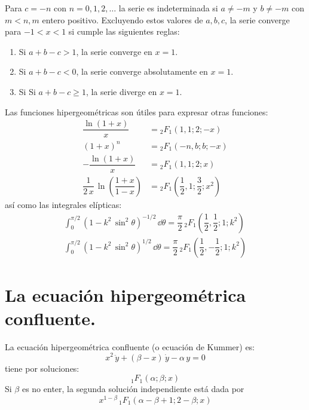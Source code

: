 \par
Para $c = -n$ con $n = 0, 1, 2, \ldots$ la serie es indeterminada si $a \neq -m$ y $b \neq -m$ con $m < n, m$ entero positivo. Excluyendo estos valores de $a, b, c$, la serie converge para $-1 < x < 1$ si cumple las siguientes reglas:
\begin{enumerate}[label=\alph*)]
\item Si $a + b - c > 1$, la serie converge en $x = 1$.
\item Si $a + b - c < 0$, la serie converge absolutamente en $x = 1$.
\item Si Si $a + b - c \geq 1$, la serie diverge en $x = 1$.
\end{enumerate}
Las funciones hipergeométricas son útiles para expresar otras funciones:
\begin{align*}
\dfrac{\ln (1 + x)}{x} &= {}_{2} F_{1}(1, 1; 2; -x) \\
(1 + x)^{n} &= {}_{2} F_{1}(-n, b; b; -x) \\
- \dfrac{\ln (1 + x)}{x} &= {}_{2} F_{1}(1, 1; 2; x) \\
\dfrac{1}{2 \, x} \, \ln \left( \dfrac{1 + x}{1 - x} \right)&= {}_{2} F_{1}\left( \dfrac{1}{2}, 1; \dfrac{3}{2}; x^{2} \right)
\end{align*}
así como las integrales elípticas:
\begin{align*}
\int_{0}^{\pi/2} (1 - k^{2} \, \sin^{2} \theta)^{-1/2} \, \dd \theta = \dfrac{\pi}{2} \, {}_{2} F_{1} \left( \dfrac{1}{2}, \dfrac{1}{2}; 1; k^{2}  \right) \\[1em]
\int_{0}^{\pi/2} (1 - k^{2} \, \sin^{2} \theta)^{1/2} \, \dd \theta = \dfrac{\pi}{2} \, {}_{2} F_{1} \left( \dfrac{1}{2}, -\dfrac{1}{2}; 1; k^{2}  \right)
\end{align*}
\section{La ecuación hipergeométrica confluente.}
La ecuación hipergeométrica confluente (o ecuación de Kummer) es:
\[  x^{2} \, \ddot{y} + (\beta - x) \, \dot{y} - \alpha \, y = 0 \]
tiene por soluciones:
\[ {}_{1} F_{1} (\alpha; \beta; x) \]
Si $\beta$ es no enter, la segunda solución independiente está dada por
\[ x^{1-\beta} \, {}_{1} F_{1} (\alpha - \beta + 1; 2 - \beta; x) \]
